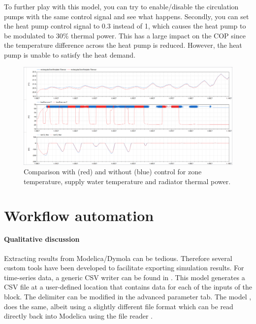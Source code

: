 \documentclass[10pt,a4paper]{article}
\begin{document}
To further play with this model, you can try to enable/disable the circulation pumps with the same control
signal and see what happens.
Secondly, you can set the heat pump control signal to 0.3 instead of 1,
which causes the heat pump to be modulated to 30\% thermal power.
This has a large impact on the COP since the temperature difference across the heat 
pump is reduced. 
However, the heat pump is unable to satisfy the heat demand.\\

\begin{figure}[h!]
	\centering
	\includegraphics[width=\linewidth]{Example7.png}
	\caption{Comparison with (red) and without (blue) control for zone temperature, supply water temperature and radiator thermal power.}
	\label{fig:res2}
\end{figure}

\newpage

\section{Workflow automation}
\paragraph{Qualitative discussion}
Extracting results from Modelica/Dymola can be tedious. 
Therefore several custom tools have been developed to facilitate exporting simulation results.
For time-series data, a generic CSV writer can be found in .
This model generates a CSV file at a user-defined location that contains
data for each of the inputs of the block. 
The delimiter can be modified in the advanced parameter tab.
The model , does the same, albeit using a slightly
different file format which can be read directly back into Modelica using the
file reader .\\
\end{document}
